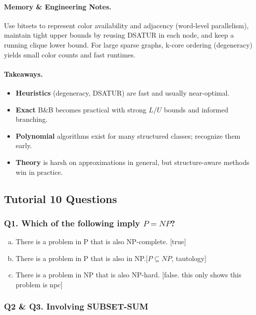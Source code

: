 \documentclass[9pt]{extarticle}
\begin{document}
\paragraph{Memory \& Engineering Notes.}
Use bitsets to represent color availability and adjacency (word-level parallelism), maintain tight upper bounds by reusing DSATUR in each node, and keep a running clique lower bound. For large sparse graphs, k-core ordering (degeneracy) yields small color counts and fast runtimes.

\paragraph{Takeaways.}
\begin{itemize}
  \item \textbf{Heuristics} (degeneracy, DSATUR) are fast and usually near-optimal.
  \item \textbf{Exact} B\&B becomes practical with strong $L/U$ bounds and informed branching.
  \item \textbf{Polynomial} algorithms exist for many structured classes; recognize them early.
  \item \textbf{Theory} is harsh on approximations in general, but structure-aware methods win in practice.
\end{itemize}

\subsection*{Tutorial 10 Questions}

\subsubsection*{Q1. Which of the following imply $P = NP$?}
\begin{enumerate}[(a)]
    \item There is a problem in P that is also NP-complete. [true]
    \item There is a problem in P that is also in NP.[$P \subseteq NP$, tautology]
    \item There is a problem in NP that is also NP-hard. [false. this only shows this problem is npc]
\end{enumerate}

\bigskip
\subsubsection*{Q2 \& Q3. Involving SUBSET-SUM}
\end{document}
